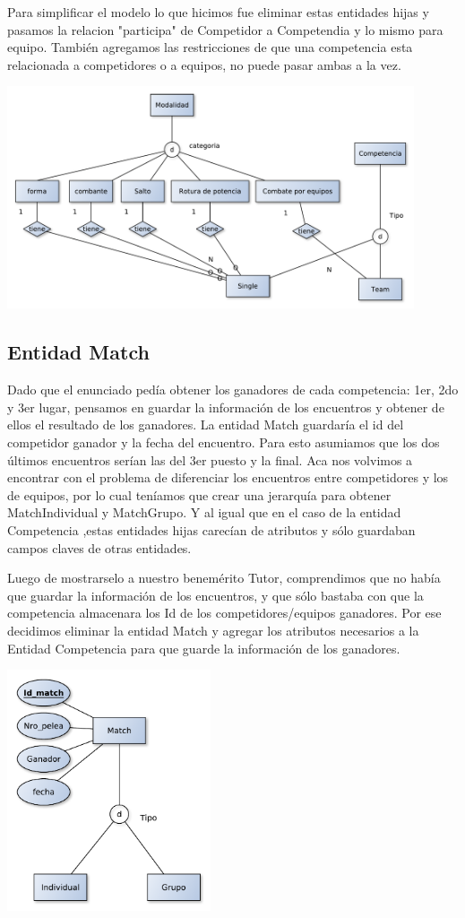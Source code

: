 Para simplificar el modelo lo que hicimos fue eliminar estas entidades hijas y pasamos la relacion "participa" de Competidor a Competendia y lo mismo para equipo. También agregamos las restricciones de que una competencia esta relacionada a competidores o a equipos, no puede pasar ambas a la vez.

\begin{center}
\includegraphics[width=12cm,keepaspectratio]{./imagenes/des1.pdf}\newline
\end{center}

\subsection{Entidad Match}

Dado que el enunciado ped\'ia obtener los ganadores de cada competencia: 1er, 2do y 3er lugar, pensamos en guardar la informaci\'on de los encuentros y obtener de ellos el resultado de los ganadores. La entidad Match guardar\'ia el id del competidor ganador y la fecha del encuentro. Para esto asumiamos que los dos \'ultimos encuentros ser\'ian las del 3er puesto y la final. Aca nos volvimos a encontrar con el problema de diferenciar los encuentros entre competidores y los de equipos, por lo cual teníamos que crear una jerarquía para obtener MatchIndividual y MatchGrupo. Y al igual que en el caso de la entidad Competencia ,estas entidades hijas carecían de atributos y s\'olo guardaban campos claves de otras entidades.

Luego de mostrarselo a nuestro benemérito Tutor, comprendimos que no había que guardar la información de los encuentros, y que s\'olo bastaba con que la competencia almacenara los Id de los competidores/equipos ganadores. Por ese decidimos eliminar la entidad Match y agregar los atributos necesarios a la Entidad Competencia para que guarde la informaci\'on de los ganadores.

\begin{center}
\includegraphics[width=6cm,keepaspectratio]{./imagenes/des2.pdf}\newline
\end{center}




